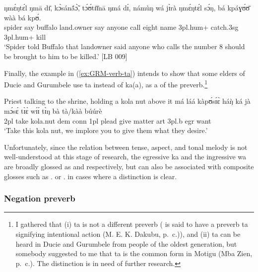 \begin{exe}
\begin{exe}
\begin{exe}
\begin{exe}
\begin{exe}
\begin{exe}
\begin{exe}
\begin{exe}
\begin{exe}
\begin{exe}
\begin{exe}
\ea\label{ex:GRM-prev-wa-hypo}

\gll ŋmɛ́ŋtɛ́l   ŋmā dɪ̄, kɔ̀sánã́ɔ̃̀,   tɔ́ʊ́tɪ̄ɪ̄nā  ŋmá dɪ́, námùŋ   wá jɪ̀rà ŋmɛ́ŋtɛ́l sɔ́ŋ, bá  kpáɣʊ́ʊ̄ wàà bá kpʊ́.\\
spider  say   {\comp}   buffalo land.owner say {\comp}  anyone   {\ingr}   call eight  name {\sc 3pl.hum+} catch.{\sc 3sg} {\foc} {\sc 3pl.hum+}  kill\\
\glt `Spider told Buffalo that landowner said anyone who calls the number 8 should be brought to him to be killed.' [LB 009]
\z


Finally, the example in (\ref{ex:GRM-verb-ta})  intends to show that some elders of Ducie and Gurumbele use  {\sls ta}  instead of {\sls ka(a)},  as a  of the preverb.\footnote{I gathered that  (i)   {\sls ta} is not a different preverb ( is said to have  a preverb {\sls ta}  signifying intentional action  (M. E. K. Dakubu, p.\ c.)),  and  (ii)   {\sls ta} can be heard in  Ducie and Gurumbele from people of the oldest generation, but somebody suggested to me that {\sls ta} is the common form in Motigu (Mba Zien, p.\ c.).  The distinction is  in need of further research. } 
 

\begin{exe}
   \ex\label{ex:GRM-verb-ta}{\rm Priest talking to the shrine, holding a kola
nut above it}
\gll  má láá kàpʊ́sɪ́ɛ̀ háŋ̀ ká jà mɔ́sɛ́ tɪ̀ɛ̀ wɪ́ɪ́ tɪ̀ŋ bà 
tà/kàà búúrè\\
{\sc 2pl} take kola.nut {\sc dem} {\sc conn} {\sc 1pl} plead give matter {\sc
art} {\sc 3pl.}b {\sc  egr} want\\
\glt   `Take this kola nut, we implore  you to give them what they desire.'
\z

Unfortunately, since the relation between tense, aspect, and tonal melody is not well-understood at this stage of research, the  egressive {\sls ka}   and the ingressive  {\sls wa} are  broadly glossed as {\egr} and {\ingr} respectively, but can also be associated with composite glosses such as {\ipfv .\fut} or  {\ipfv .\pres}  in cases where a distinction is clear.


\subsubsection{Negation preverb}
\label{sec:GRM-verb-neg}




\end{exe}
\end{exe}
\end{exe}
\end{exe}
\end{exe}
\end{exe}
\end{exe}
\end{exe}
\end{exe}
\end{exe}
\end{exe}
\end{exe}
